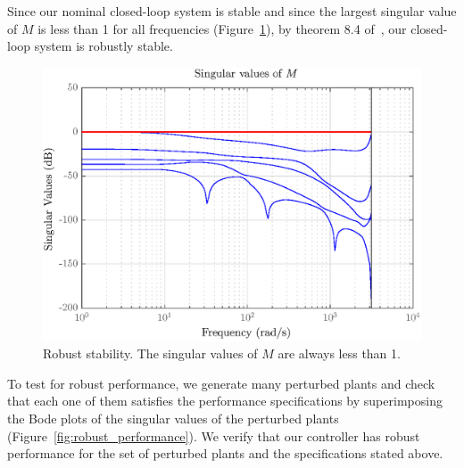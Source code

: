 \documentclass[12pt,lot, lof]{puthesis}
\begin{document}
Since our nominal closed-loop system is stable and since the largest singular value of $M$ is less than 1 for all frequencies (Figure~\ref{fig:robust_stability}), by theorem 8.4 of~\cite{SandP}, our closed-loop system is robustly stable.

\begin{figure}[htbp]
	\centering
	\includegraphics{chap10/robust_stability}
	\caption{Robust stability. The singular values of $M$ are always less than 1.}
	\label{fig:robust_stability}
\end{figure}


To test for robust performance, we generate many perturbed plants and check that each one of them satisfies the performance specifications by superimposing the Bode plots of the singular values of the perturbed plants (Figure~\ref{fig:robust_performance}).
We verify that our controller has robust performance for the set of perturbed plants and the specifications stated above.
\end{document}
